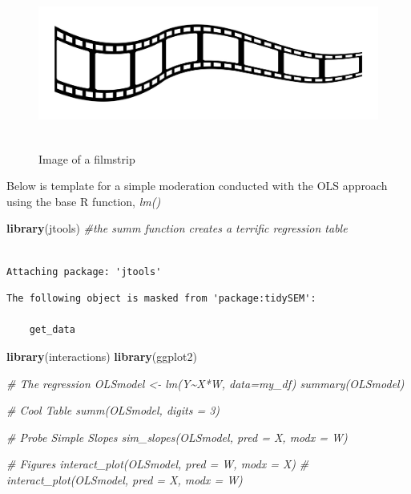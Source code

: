 \documentclass[
  11pt,
]{book}
\newenvironment{Shaded}{\begin{snugshade}}{\end{snugshade}}
\newcommand{\CommentTok}[1]{\textcolor[rgb]{0.37,0.37,0.37}{\textit{#1}}}
\newcommand{\FunctionTok}[1]{\textcolor[rgb]{0.27,0.27,0.27}{\textbf{#1}}}
\newcommand{\NormalTok}[1]{#1}
\begin{document}
\begin{figure}
\hypertarget{id}{%
\centering
\includegraphics[width=6.45833in,height=2.19792in]{images/film-strip-1.jpg}
\caption{Image of a filmstrip}\label{id}
}
\end{figure}

Below is template for a simple moderation conducted with the OLS approach using the base R function, \emph{lm()}

\begin{Shaded}
\begin{Highlighting}[]
\FunctionTok{library}\NormalTok{(jtools)  }\CommentTok{\#the summ function creates a terrific regression table}
\end{Highlighting}
\end{Shaded}

\begin{verbatim}

Attaching package: 'jtools'
\end{verbatim}

\begin{verbatim}
The following object is masked from 'package:tidySEM':

    get_data
\end{verbatim}

\begin{Shaded}
\begin{Highlighting}[]
\FunctionTok{library}\NormalTok{(interactions)}
\FunctionTok{library}\NormalTok{(ggplot2)}

\CommentTok{\# The regression OLSmodel \textless{}{-} lm(Y\textasciitilde{}X*W, data=my\_df) summary(OLSmodel)}

\CommentTok{\# Cool Table summ(OLSmodel, digits = 3)}

\CommentTok{\# Probe Simple Slopes sim\_slopes(OLSmodel, pred = X, modx = W)}

\CommentTok{\# Figures interact\_plot(OLSmodel, pred = W, modx = X)}
\CommentTok{\# interact\_plot(OLSmodel, pred = X, modx = W)}
\end{Highlighting}
\end{Shaded}
\end{document}
